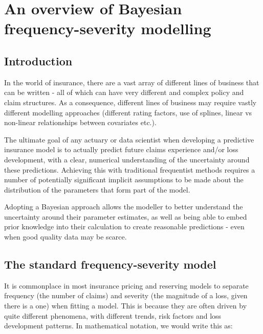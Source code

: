 \documentclass[
]{book}
\begin{document}
\hypertarget{an-overview-of-bayesian-frequency-severity-modelling}{%
\section{An overview of Bayesian frequency-severity modelling}\label{an-overview-of-bayesian-frequency-severity-modelling}}

\hypertarget{introduction}{%
\subsection{Introduction}\label{introduction}}

In the world of insurance, there are a vast array of different lines of business that can be written - all of which can have very different and complex policy and claim structures. As a consequence, different lines of business may require vastly different modelling approaches (different rating factors, use of splines, linear vs non-linear relationships between covariates etc.).

The ultimate goal of any actuary or data scientist when developing a predictive insurance model is to actually predict future claims experience and/or loss development, with a clear, numerical understanding of the uncertainty around these predictions. Achieving this with traditional frequentist methods requires a number of potentially significant implicit assumptions to be made about the distribution of the parameters that form part of the model.

Adopting a Bayesian approach allows the modeller to better understand the uncertainty around their parameter estimates, as well as being able to embed prior knowledge into their calculation to create reasonable predictions - even when good quality data may be scarce.

\hypertarget{the-standard-frequency-severity-model}{%
\subsection{The standard frequency-severity model}\label{the-standard-frequency-severity-model}}

It is commonplace in most insurance pricing and reserving models to separate frequency (the number of claims) and severity (the magnitude of a loss, given there is a one) when fitting a model. This is because they are often driven by quite different phenomena, with different trends, risk factors and loss development patterns. In mathematical notation, we would write this as:
\end{document}
